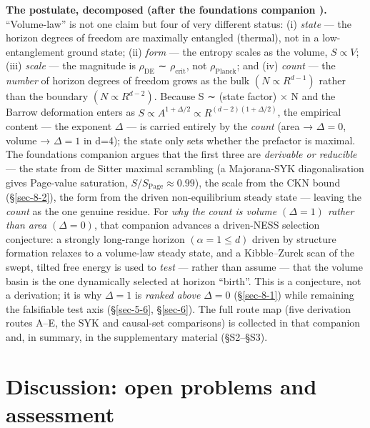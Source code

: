 \documentclass[preprint,12pt]{elsarticle}
\begin{document}
\textbf{The postulate, decomposed (after the foundations companion
\citep{Pandev:2026foundations}).} ``Volume-law'' is not one claim but
four of very different status: (i) \emph{state} --- the horizon degrees
of freedom are maximally entangled (thermal), not in a low-entanglement
ground state; (ii) \emph{form} --- the entropy scales as the volume,
\(S \propto  V\); (iii) \emph{scale} --- the magnitude is
\(\rho _\mathrm{DE}\) ∼ \(\rho _{\mathrm{crit}}\), not
\(\rho _{\mathrm{Planck}}\); and (iv) \emph{count} --- the \emph{number}
of horizon degrees of freedom grows as the bulk \((N \propto  R^{d-1})\)
rather than the boundary \((N \propto  R^{d-2})\). Because S ∼ (state
factor) × N and the Barrow deformation enters as
\(S \propto  A^{1+\Delta /2} \propto  R^{(d-2)(1+\Delta /2)}\), the
empirical content --- the exponent \(\Delta\) --- is carried entirely by
the \emph{count} (area → \(\Delta =0\), volume → \(\Delta =1\) in d=4);
the state only sets whether the prefactor is maximal. The foundations
companion argues that the first three are \emph{derivable or reducible}
--- the state from de Sitter maximal scrambling (a Majorana-SYK
diagonalisation gives Page-value saturation,
\(S/S_{\mathrm{Page}} \approx  0.99\)), the scale from the CKN bound
(§\ref{sec-8-2}), the form from the driven non-equilibrium steady state
--- leaving the \emph{count} as the one genuine residue. For \emph{why
the count is volume \((\Delta =1)\) rather than area \((\Delta =0)\)},
that companion advances a driven-NESS selection conjecture: a strongly
long-range horizon \((\alpha  = 1 \leq  d)\) driven by structure
formation relaxes to a volume-law steady state, and a Kibble--Zurek scan
of the swept, tilted free energy is used to \emph{test} --- rather than
assume --- that the volume basin is the one dynamically selected at
horizon ``birth''. This is a conjecture, not a derivation; it is why
\(\Delta =1\) is \emph{ranked above} \(\Delta =0\) (§\ref{sec-8-1})
while remaining the falsifiable test axis (§\ref{sec-5-6},
§\ref{sec-6}). The full route map (five derivation routes A--E, the SYK
and causal-set comparisons) is collected in that companion and, in
summary, in the supplementary material (§S2--§S3).

\section{Discussion: open problems and assessment}\label{sec-9}
\end{document}

